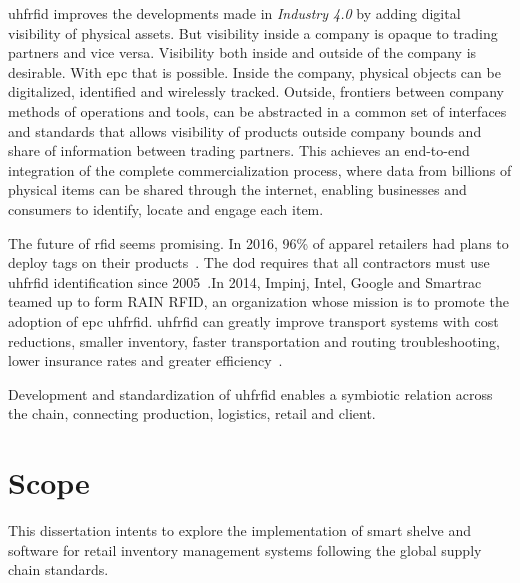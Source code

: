 \ac{uhfrfid} improves the developments made in \emph{Industry 4.0} by adding digital visibility of physical assets. But visibility inside a company is opaque to trading partners and vice versa. Visibility both inside and outside of the company is desirable. With \ac{epc} that is possible. Inside the company, physical objects can be digitalized, identified and wirelessly tracked. Outside, frontiers between company methods of operations and tools, can be abstracted in a common set of interfaces and standards that allows visibility of products outside company bounds and share of information between trading partners.
This achieves an end-to-end integration of the complete commercialization process, where data from billions of physical items can be shared through the internet, enabling businesses and consumers to identify, locate and engage each item.

The future of \ac{rfid} seems promising. In 2016, 96\% of apparel retailers had plans to deploy tags on their products~\cite{hardgrave2016StateRFID}. The \ac{dod} requires that all contractors must use \ac{uhfrfid} identification since 2005~\cite{DODReleasesFinal}.In 2014, Impinj, Intel, Google and Smartrac teamed up to form RAIN RFID, an organization whose mission is to promote the adoption of \acs{epc} \ac{uhfrfid}. \ac{uhfrfid} can greatly improve transport systems with cost reductions, smaller inventory, faster transportation and routing troubleshooting, lower insurance rates and greater efficiency~\cite{oanaRFIDTechnologyContainers2013}.

Development and standardization of \ac{uhfrfid} enables a symbiotic relation across the chain, connecting production, logistics, retail and client.

\section{Scope}

This dissertation intents to explore the implementation of smart shelve and software for retail inventory management systems following the global supply chain standards. 






